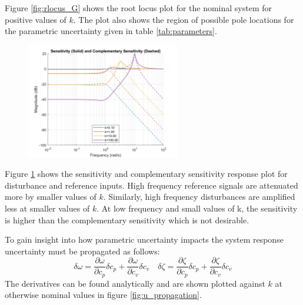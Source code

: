 \documentclass{article}
\begin{document}
Figure \ref{fig:rlocus_G} shows the root locus plot for the nominal system for positive values of $k$.
The plot also shows the region of possible pole locations for the parametric uncertainty given in table \ref{tab:parameters}.

\begin{figure}[H]
    \centering
    \includegraphics[width=0.6\textwidth]{figures/sensitivities.png}
    \caption{}
    \label{fig:sensitivities}
\end{figure}

Figure \ref{fig:sensitivities} shows the sensitivity and complementary sensitivity response plot for disturbance and reference inputs.
High frequency reference signals are attenuated more by smaller values of $k$. Similarly, high frequency disturbances are amplified less at smaller values of $k$.
At low frequency and small values of k, the sensitivity is higher than the complementary sensitivity which is not desirable.

To gain insight into how parametric uncertainty impacts the system response uncertainty must be propagated as follows:
\begin{equation}
    \delta \omega = \frac{\partial \omega}{\partial c_p} \delta c_p + \frac{\partial \omega}{\partial c_v} \delta c_v \quad \delta \zeta = \frac{\partial \zeta}{\partial c_p} \delta c_p + \frac{\partial \zeta}{\partial c_v} \delta c_v
\end{equation}
The derivatives can be found analytically and are shown plotted against $k$ at otherwise nominal values in figure \ref{fig:u_propagation}.
\end{document}
